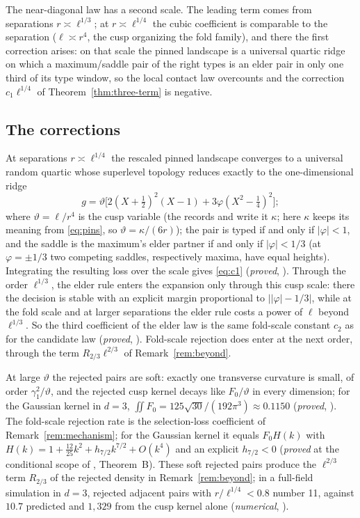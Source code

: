 The near-diagonal law has a second scale. The leading term comes from separations $r\asymp\ell^{1/3}$; at $r\asymp\ell^{1/4}$ the cubic coefficient is comparable to the separation ($\ell\asymp r^4$, the cusp organizing the fold family), and there the first correction arises: on that scale the pinned landscape is a universal quartic ridge on which a maximum/saddle pair of the right types is an elder pair in only one third of its type window, so the local contact law overcounts and the correction $c_1\ell^{1/4}$ of Theorem~\ref{thm:three-term} is negative.

\subsection{The corrections}\label{ssec:corrections}
At separations $r\asymp\ell^{1/4}$ the rescaled pinned landscape converges to a universal random quartic whose superlevel topology reduces exactly to the one-dimensional ridge
\[
g=\vartheta\bigl[2(X+\tfrac12)^2(X-1)+3\varphi(X^2-\tfrac14)^2\bigr];
\]
where $\vartheta=\ell/r^4$ is the cusp variable (the records  and  write it $\kappa$; here $\kappa$ keeps its meaning from \eqref{eq:pins}, so $\vartheta=\kappa/(6r)$); the pair is typed if and only if $|\varphi|<1$, and the saddle is the maximum's elder partner if and only if $|\varphi|<1/3$ (at $\varphi=\pm1/3$ two competing saddles, respectively maxima, have equal heights). Integrating the resulting loss over the scale gives \eqref{eq:c1} (\emph{proved}, ). Through the order $\ell^{1/3}$, the elder rule enters the expansion only through this cusp scale: there the decision is stable with an explicit margin proportional to $\bigl||\varphi|-1/3\bigr|$, while at the fold scale and at larger separations the elder rule costs a power of $\ell$ beyond $\ell^{1/3}$. So the third coefficient of the elder law is the same fold-scale constant $c_2$ as for the candidate law (\emph{proved}, ). Fold-scale rejection does enter at the next order, through the term $R_{2/3}\ell^{2/3}$ of Remark~\ref{rem:beyond}.

At large $\vartheta$ the rejected pairs are soft: exactly one transverse curvature is small, of order $\gamma_1^2/\vartheta$, and the rejected cusp kernel decays like $F_0/\vartheta$ in every dimension; for the Gaussian kernel in $d=3$, $\iint F_0=125\sqrt{30}/(192\pi^3)\approx0.1150$ (\emph{proved}, ). The fold-scale rejection rate is the selection-loss coefficient of Remark~\ref{rem:mechanism}; for the Gaussian kernel it equals $F_0H(k)$ with $H(k)=1+\tfrac{12}{25}k^2+h_{7/2}k^{7/2}+O(k^4)$ and an explicit $h_{7/2}<0$ (\emph{proved} at the conditional scope of , Theorem~B). These soft rejected pairs produce the $\ell^{2/3}$ term $R_{2/3}$ of the rejected density in Remark~\ref{rem:beyond}; in a full-field simulation in $d=3$, rejected adjacent pairs with $r/\ell^{1/4}<0.8$ number 11, against $10.7$ predicted and $1{,}329$ from the cusp kernel alone (\emph{numerical}, ).

